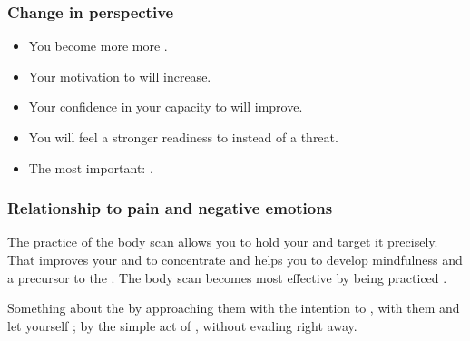 \begin{frame}
\frametitle{Change in perspective}

\begin{itemize}
\item You become more more .
\item Your motivation to  will increase.
\item Your confidence in your capacity to  will improve.
\item You will feel a stronger readiness to  instead of a threat.
\item The most important: .
\end{itemize} 

\end{frame}
\begin{frame}
\frametitle{Relationship to pain and negative emotions}



The practice of the body scan allows you to hold your  and target it precisely. That improves your  and to concentrate and helps you to develop mindfulness and a precursor to the . The body scan becomes most effective by being practiced .

Something about the  by approaching them with the intention to ,  with them and let yourself ; by the simple act of , without evading right away.

\end{frame}
